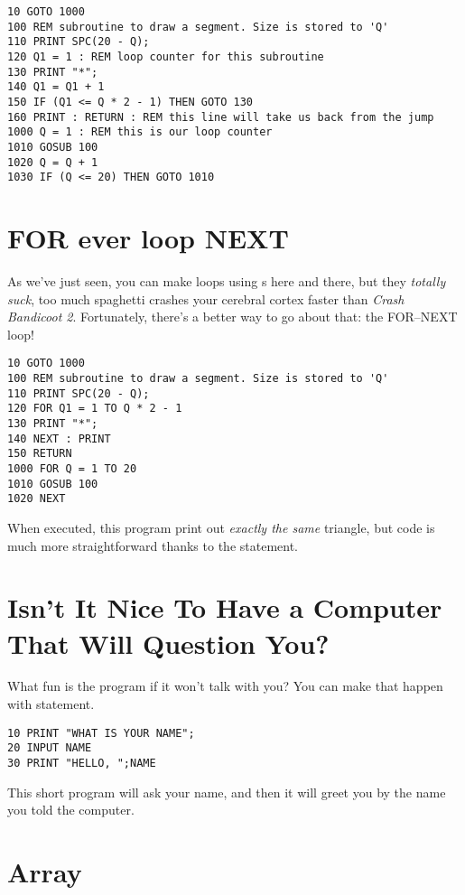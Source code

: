 \begin{lstlisting}
10 GOTO 1000
100 REM subroutine to draw a segment. Size is stored to 'Q'
110 PRINT SPC(20 - Q);
120 Q1 = 1 : REM loop counter for this subroutine
130 PRINT "*";
140 Q1 = Q1 + 1
150 IF (Q1 <= Q * 2 - 1) THEN GOTO 130
160 PRINT : RETURN : REM this line will take us back from the jump
1000 Q = 1 : REM this is our loop counter
1010 GOSUB 100
1020 Q = Q + 1
1030 IF (Q <= 20) THEN GOTO 1010
\end{lstlisting}

\section[FOR--NEXT Loop]{FOR ever loop NEXT}

As we've just seen, you can make loops using s here and there, but they \emph{totally suck}, too much spaghetti crashes your cerebral cortex faster than \emph{Crash Bandicoot 2}. Fortunately, there's a better way to go about that: the FOR--NEXT loop!

\begin{lstlisting}
10 GOTO 1000
100 REM subroutine to draw a segment. Size is stored to 'Q'
110 PRINT SPC(20 - Q);
120 FOR Q1 = 1 TO Q * 2 - 1
130 PRINT "*";
140 NEXT : PRINT
150 RETURN
1000 FOR Q = 1 TO 20
1010 GOSUB 100
1020 NEXT
\end{lstlisting}

When executed, this program print out \emph{exactly the same} triangle, but code is much more straightforward thanks to the  statement.

\section[Get User INPUT]{Isn't It Nice To Have a Computer That Will Question You?}

What fun is the program if it won't talk with you? You can make that happen with  statement.

\begin{lstlisting}
10 PRINT "WHAT IS YOUR NAME";
20 INPUT NAME
30 PRINT "HELLO, ";NAME
\end{lstlisting}

This short program will ask your name, and then it will greet you by the name you told the computer.

\section[Array]{Array}

